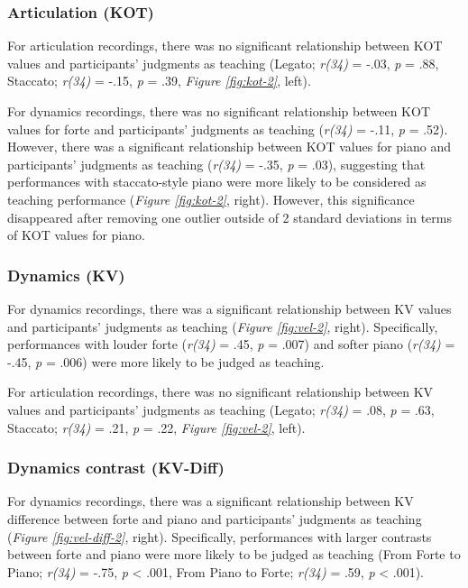 \documentclass[
  man,floatsintext]{apa6}
\begin{document}
\hypertarget{articulation-kot-1}{%
\subsubsection{Articulation (KOT)}\label{articulation-kot-1}}

For articulation recordings, there was no significant relationship between KOT values and participants' judgments as teaching (Legato; \emph{r(34)} = -.03, \emph{p} = .88, Staccato; \emph{r(34)} = -.15, \emph{p} = .39, \emph{Figure \ref{fig:kot-2}}, left).

For dynamics recordings, there was no significant relationship between KOT values for forte and participants' judgments as teaching (\emph{r(34)} = -.11, \emph{p} = .52). However, there was a significant relationship between KOT values for piano and participants' judgments as teaching (\emph{r(34)} = -.35, \emph{p} = .03), suggesting that performances with staccato-style piano were more likely to be considered as teaching performance (\emph{Figure \ref{fig:kot-2}}, right). However, this significance disappeared after removing one outlier outside of 2 standard deviations in terms of KOT values for piano.

\hypertarget{dynamics-kv-1}{%
\subsubsection{Dynamics (KV)}\label{dynamics-kv-1}}

For dynamics recordings, there was a significant relationship between KV values and participants' judgments as teaching (\emph{Figure \ref{fig:vel-2}}, right). Specifically, performances with louder forte (\emph{r(34)} = .45, \emph{p} = .007) and softer piano (\emph{r(34)} = -.45, \emph{p} = .006) were more likely to be judged as teaching.

For articulation recordings, there was no significant relationship between KV values and participants' judgments as teaching (Legato; \emph{r(34)} = .08, \emph{p} = .63, Staccato; \emph{r(34)} = .21, \emph{p} = .22, \emph{Figure \ref{fig:vel-2}}, left).

\hypertarget{dynamics-contrast-kv-diff-1}{%
\subsubsection{Dynamics contrast (KV-Diff)}\label{dynamics-contrast-kv-diff-1}}

For dynamics recordings, there was a significant relationship between KV difference between forte and piano and participants' judgments as teaching (\emph{Figure \ref{fig:vel-diff-2}}, right). Specifically, performances with larger contrasts between forte and piano were more likely to be judged as teaching (From Forte to Piano; \emph{r(34)} = -.75, \emph{p} \textless{} .001, From Piano to Forte; \emph{r(34)} = .59, \emph{p} \textless{} .001).
\end{document}
